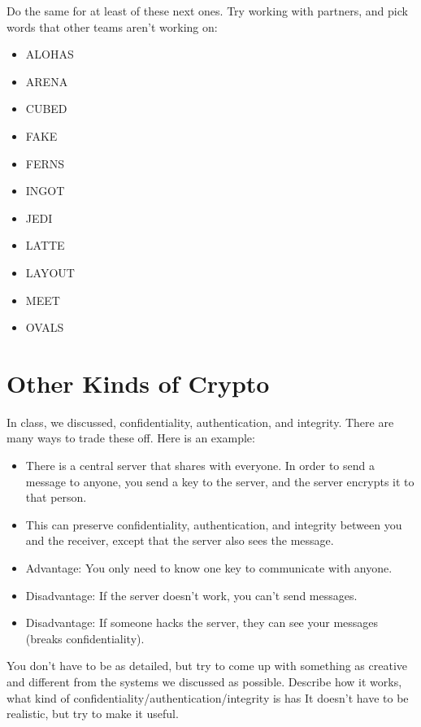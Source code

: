 \documentclass[12pt]{article}
\begin{document}
Do the same for at least  of these next ones. Try working with partners, and pick words that other teams aren't working on:

\begin{itemize}
\item ALOHAS 
\item ARENA 
\item CUBED 
\item FAKE 
\item FERNS 
\item INGOT 
\item JEDI 
\item LATTE   
\item LAYOUT 
\item MEET 
\item OVALS 
\end{itemize}

\section{Other Kinds of Crypto}

In class, we discussed, confidentiality, authentication, and integrity. There are many ways to trade these off. Here is an example:

\begin{itemize}
\item There is a central server that shares with everyone. In order to send a message to anyone, you send a key to the server, and the server encrypts it to that person.
\item This can preserve confidentiality, authentication, and integrity between you and the receiver, except that the server also sees the message.
\item Advantage: You only need to know one key to communicate with anyone.
\item Disadvantage: If the server doesn't work, you can't send messages.
\item Disadvantage: If someone hacks the server, they can see your messages (breaks confidentiality).
\end{itemize}

You don't have to be as detailed, but try to come up with something as creative and different from the systems we discussed as possible. Describe how it works, what kind of confidentiality/authentication/integrity is has
It doesn't have to be realistic, but try to make it useful.
\end{document}
